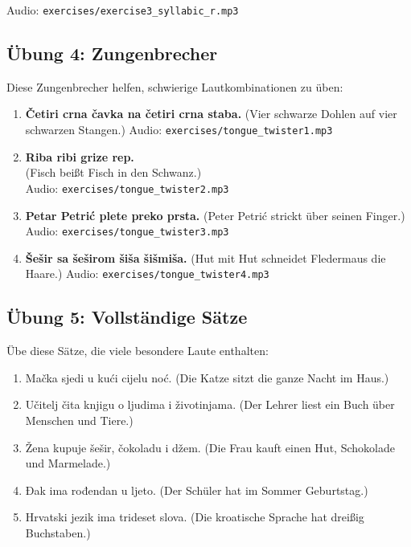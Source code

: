 Audio: \texttt{exercises/exercise3\_syllabic\_r.mp3}

\subsection{Übung 4: Zungenbrecher}

Diese Zungenbrecher helfen, schwierige Lautkombinationen zu üben:

\begin{enumerate}
    \item \textbf{Četiri crna čavka na četiri crna staba.}
    (Vier schwarze Dohlen auf vier schwarzen Stangen.)
    Audio: \texttt{exercises/tongue\_twister1.mp3}
    
    \item \textbf{Riba ribi grize rep.}\\
    (Fisch beißt Fisch in den Schwanz.)\\
    Audio: \texttt{exercises/tongue\_twister2.mp3}
    
    \item \textbf{Petar Petrić plete preko prsta.}
    (Peter Petrić strickt über seinen Finger.)
    Audio: \texttt{exercises/tongue\_twister3.mp3}
    
    \item \textbf{Šešir sa šeširom šiša šišmiša.}
    (Hut mit Hut schneidet Fledermaus die Haare.)
    Audio: \texttt{exercises/tongue\_twister4.mp3}
\end{enumerate}

\subsection{Übung 5: Vollständige Sätze}

Übe diese Sätze, die viele besondere Laute enthalten:

\begin{enumerate}
    \item Mačka sjedi u kući cijelu noć.
    (Die Katze sitzt die ganze Nacht im Haus.)
    
    \item Učitelj čita knjigu o ljudima i životinjama.
    (Der Lehrer liest ein Buch über Menschen und Tiere.)
    
    \item Žena kupuje šešir, čokoladu i džem.
    (Die Frau kauft einen Hut, Schokolade und Marmelade.)
    
    \item Đak ima rođendan u ljeto.
    (Der Schüler hat im Sommer Geburtstag.)
    
    \item Hrvatski jezik ima trideset slova.
    (Die kroatische Sprache hat dreißig Buchstaben.)
\end{enumerate}

